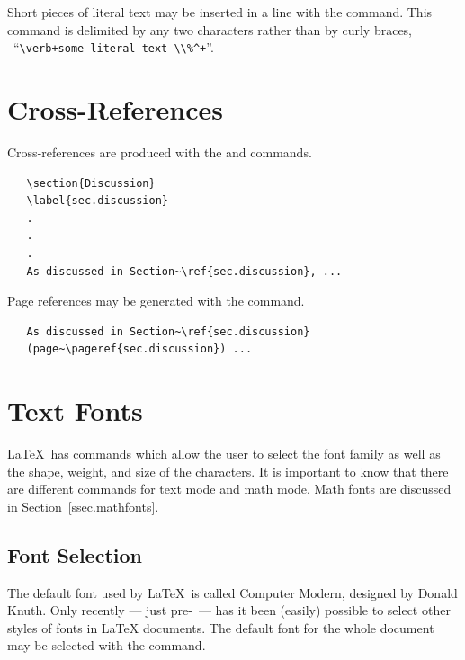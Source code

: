 Short pieces of literal text may be inserted in a line with the  command.
This command is delimited by any two characters rather than by curly braces, \eg\ \newline ``\verb=\verb+some literal text \\%^+=''.
\section{Cross-References}
Cross-references are produced with the  and  commands.
\begin{verbatim}
   \section{Discussion}
   \label{sec.discussion}
   .
   . 
   .
   As discussed in Section~\ref{sec.discussion}, ...
\end{verbatim}
Page references may be generated with the  command.
\begin{verbatim}
   As discussed in Section~\ref{sec.discussion} 
   (page~\pageref{sec.discussion}) ... 
\end{verbatim}
\section{Text Fonts}
\LaTeX\ has commands which allow the user to select the font family as well as the shape, weight, and size of the characters.
It is important to know that there are different commands for text mode and math mode.
Math fonts are discussed in Section~\ref{ssec.mathfonts}. 
\subsection{Font Selection}
The default font used by \LaTeX\ is called Computer Modern, designed by Donald Knuth.
Only recently --- just pre-\LaTeXe\ --- has it been (easily) possible to select other styles of fonts in LaTeX documents.
The default font for the whole document may be selected with the  command.
